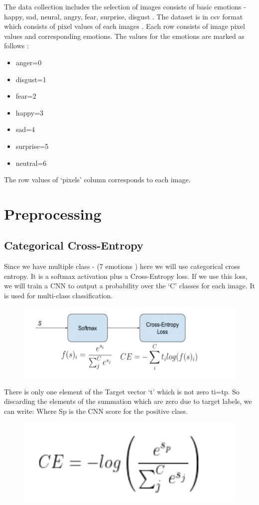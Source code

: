The data collection includes the selection of images consists of basic emotions - happy, sad, neural, angry, fear, surprise, disgust . The dataset is in csv format which consists of pixel values of each images . Each row consists of image pixel values and corresponding emotions. The values for the emotions are marked as follows :
\begin{itemize}
    \item anger=0
    \item disgust=1
    \item fear=2
    \item happy=3
    \item sad=4
    \item surprise=5
    \item neutral=6
\end{itemize}
The row values of ‘pixels’ column corresponds to each image.

\section{Preprocessing}
\subsection{Categorical Cross-Entropy}
Since we have multiple class - (7 emotions ) here we will use categorical cross entropy. It is a softmax activation plus a Cross-Entropy loss. If we use this loss, we will train a CNN to output a probability over the  ‘C’ classes for each image. It is used for multi-class classification.
\begin{figure}[h]
\label{ss}
\centering
\includegraphics[width= 13 cm]{preprocessing1.jpeg}
\end{figure}
There is only one element of the Target vector ‘t’ which is not zero  ti=tp. So discarding the elements of the summation which are zero due to target labels, we can write:
Where Sp is the CNN score for the positive class.
\begin{figure}[h]
\label{ss}
\centering
\includegraphics[width= 13 cm]{preprocessing2.jpeg}
\end{figure}

